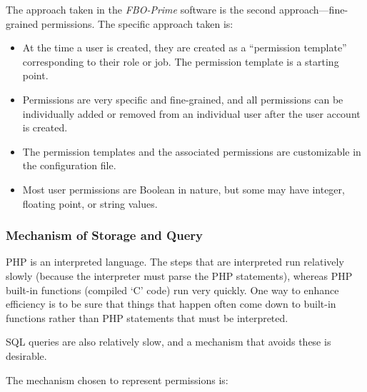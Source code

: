 \documentclass[letterpaper,10pt,titlepage]{article}
\newcommand{\productbasename}{FBO-Prime}
\begin{document}
The approach taken in the \emph{\productbasename{}} software is the second
approach---fine-grained permissions.  The specific approach taken is:

\begin{itemize}
\item At the time a user is created, they are created as a ``permission template'' corresponding
      to their role or job.  The permission template is a starting point.
\item Permissions are very specific and fine-grained, and all permissions can be
      individually added or removed from an individual user after the user
      account is created.
\item The permission templates and the associated permissions are 
      customizable in the configuration file.
\item Most user permissions are Boolean in nature, but some may have integer,
      floating point, or
      string values.
\end{itemize}



\subsubsection{Mechanism of Storage and Query}
\label{stdd0:supm0:sstq0}

PHP is an interpreted language.  The steps that are interpreted run
relatively slowly (because the interpreter must parse the PHP statements), whereas
PHP built-in functions (compiled `C' code) run very quickly.  One way to enhance
efficiency is to be sure that things that happen often come down to
built-in functions rather than PHP statements that must be interpreted.

SQL queries are also relatively slow, and a mechanism that avoids these
is desirable.

The mechanism chosen to represent permissions is:
\end{document}
